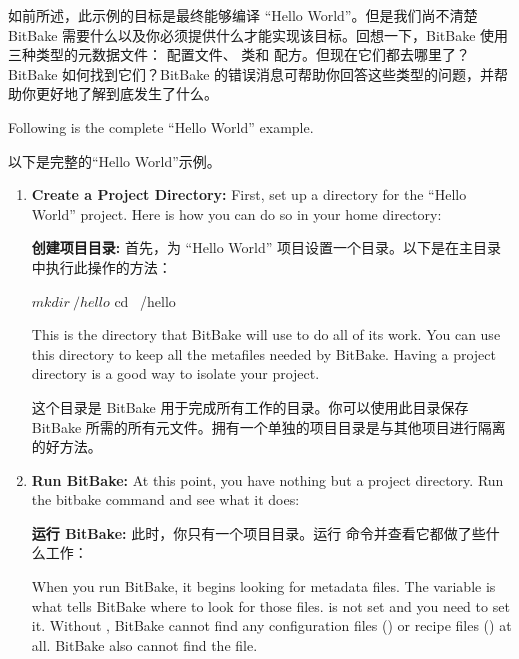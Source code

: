 如前所述，此示例的目标是最终能够编译 ``Hello World''。但是我们尚不清楚 BitBake 需要什么以及你必须提供什么才能实现该目标。回想一下，BitBake 使用三种类型的元数据文件： 配置文件、 类和 配方。但现在它们都去哪里了？BitBake 如何找到它们？BitBake 的错误消息可帮助你回答这些类型的问题，并帮助你更好地了解到底发生了什么。

Following is the complete “Hello World” example.

以下是完整的“Hello World”示例。

\begin{enumerate}
\setlength\itemsep{1.0em}
\item \textbf{Create a Project Directory:} First, set up a directory for the “Hello World” project. Here is how you can do so in your home directory:

\medskip
\textbf{创建项目目录:} 首先，为 ``Hello World'' 项目设置一个目录。以下是在主目录中执行此操作的方法：

\begin{pyglist}
$ mkdir ~/hello
$ cd ~/hello
\end{pyglist}

\medskip
This is the directory that BitBake will use to do all of its work. You can use this directory to keep all the metafiles needed by BitBake. Having a project directory is a good way to isolate your project.

\medskip
这个目录是 BitBake 用于完成所有工作的目录。你可以使用此目录保存 BitBake 所需的所有元文件。拥有一个单独的项目目录是与其他项目进行隔离的好方法。

\item \textbf{Run BitBake:} At this point, you have nothing but a project directory. Run the bitbake command and see what it does:

\medskip
\textbf{运行 BitBake:} 此时，你只有一个项目目录。运行  命令并查看它都做了些什么工作：

\medskip
{}

\medskip
When you run BitBake, it begins looking for metadata files. The  variable is what tells BitBake where to look for those files.  is not set and you need to set it. Without , BitBake cannot find any configuration files () or recipe files () at all. BitBake also cannot find the  file.


\end{enumerate}
